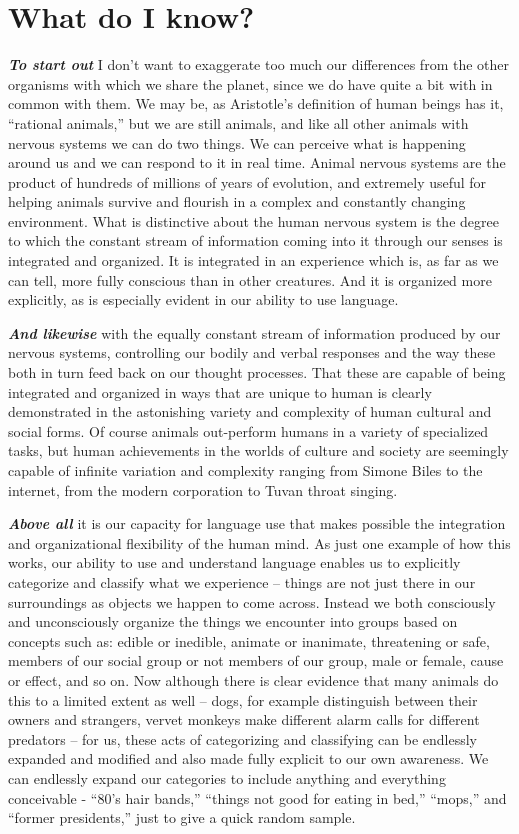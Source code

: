 \documentclass[]{book}
\begin{document}
\hypertarget{what-do-i-know}{%
\section{What do I know?}\label{what-do-i-know}}

\textbf{\emph{To start out}} I don't want to exaggerate too much our differences from the other organisms with which we share the planet, since we do have quite a bit with in common with them. We may be, as Aristotle's definition of human beings has it, ``rational animals,'' but we are still animals, and like all other animals with nervous systems we can do two things. We can perceive what is happening around us and we can respond to it in real time. Animal nervous systems are the product of hundreds of millions of years of evolution, and extremely useful for helping animals survive and flourish in a complex and constantly changing environment. What is distinctive about the human nervous system is the degree to which the constant stream of information coming into it through our senses is integrated and organized. It is integrated in an experience which is, as far as we can tell, more fully conscious than in other creatures. And it is organized more explicitly, as is especially evident in our ability to use language.

\textbf{\emph{And likewise}} with the equally constant stream of information produced by our nervous systems, controlling our bodily and verbal responses and the way these both in turn feed back on our thought processes. That these are capable of being integrated and organized in ways that are unique to human is clearly demonstrated in the astonishing variety and complexity of human cultural and social forms. Of course animals out-perform humans in a variety of specialized tasks, but human achievements in the worlds of culture and society are seemingly capable of infinite variation and complexity ranging from Simone Biles to the internet, from the modern corporation to Tuvan throat singing.

\textbf{\emph{Above all}} it is our capacity for language use that makes possible the integration and organizational flexibility of the human mind. As just one example of how this works, our ability to use and understand language enables us to explicitly categorize and classify what we experience -- things are not just there in our surroundings as objects we happen to come across. Instead we both consciously and unconsciously organize the things we encounter into groups based on concepts such as: edible or inedible, animate or inanimate, threatening or safe, members of our social group or not members of our group, male or female, cause or effect, and so on. Now although there is clear evidence that many animals do this to a limited extent as well -- dogs, for example distinguish between their owners and strangers, vervet monkeys make different alarm calls for different predators -- for us, these acts of categorizing and classifying can be endlessly expanded and modified and also made fully explicit to our own awareness. We can endlessly expand our categories to include anything and everything conceivable - ``80's hair bands,'' ``things not good for eating in bed,'' ``mops,'' and ``former presidents,'' just to give a quick random sample.
\end{document}
